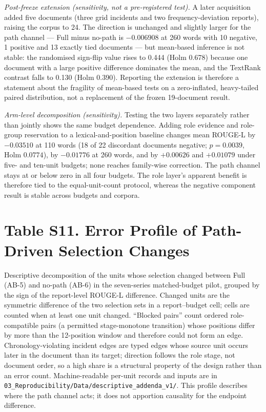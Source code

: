 \documentclass[11pt]{article}
\begin{document}
\emph{Post-freeze extension (sensitivity, not a pre-registered test).} A later acquisition added five documents (three grid incidents and two frequency-deviation reports), raising the corpus to 24. The direction is unchanged and slightly larger for the path channel --- Full minus no-path is $-0.006908$ at 260 words with 10 negative, 1 positive and 13 exactly tied documents --- but mean-based inference is not stable: the randomised sign-flip value rises to 0.444 (Holm 0.678) because one document with a large positive difference dominates the mean, and the TextRank contrast falls to 0.130 (Holm 0.390). Reporting the extension is therefore a statement about the fragility of mean-based tests on a zero-inflated, heavy-tailed paired distribution, not a replacement of the frozen 19-document result.

\emph{Arm-level decomposition (sensitivity).} Testing the two layers separately rather than jointly shows the same budget dependence. Adding role evidence and role-group reservation to a lexical-and-position baseline changes mean ROUGE-L by $-0.03510$ at 110 words (18 of 22 discordant documents negative; $p=0.0039$, Holm $0.0774$), by $-0.01776$ at 260 words, and by $+0.00626$ and $+0.01079$ under five- and ten-unit budgets; none reaches family-wise correction. The path channel stays at or below zero in all four budgets. The role layer's apparent benefit is therefore tied to the equal-unit-count protocol, whereas the negative component result is stable across budgets and corpora.

\section*{Table S11. Error Profile of Path-Driven Selection Changes}

Descriptive decomposition of the units whose selection changed between Full (AB-5) and no-path (AB-6) in the seven-series matched-budget pilot, grouped by the sign of the report-level ROUGE-L difference. Changed units are the symmetric difference of the two selection sets in a report--budget cell; cells are counted when at least one unit changed. ``Blocked pairs'' count ordered role-compatible pairs (a permitted stage-monotone transition) whose positions differ by more than the 12-position window and therefore could not form an edge. Chronology-violating incident edges are typed edges whose source unit occurs later in the document than its target; direction follows the role stage, not document order, so a high share is a structural property of the design rather than an error count. Machine-readable per-unit records and inputs are in \nolinkurl{03_Reproducibility/Data/descriptive_addenda_v1/}. This profile describes where the path channel acts; it does not apportion causality for the endpoint difference.
\end{document}
